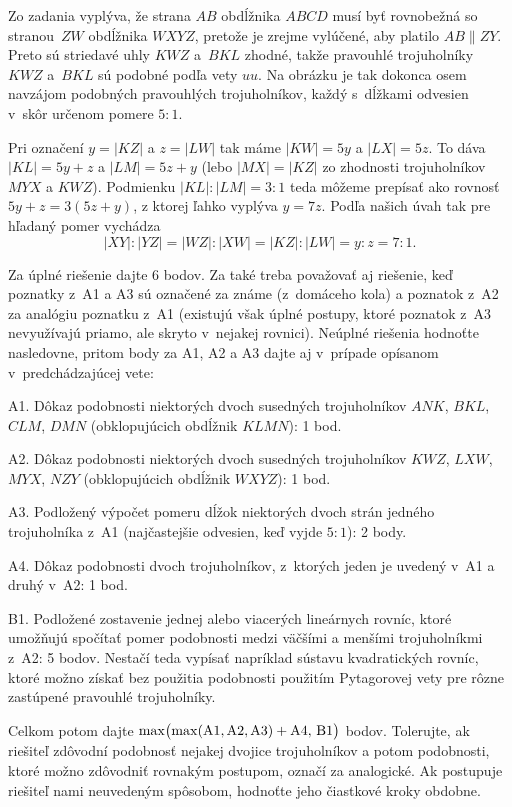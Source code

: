 {Zo zadania vyplýva, že strana $AB$ obdĺžnika $ABCD$ musí byť
rovnobežná so stranou~$ZW$ obdĺžnika $WXYZ$, pretože je zrejme vylúčené, aby
platilo $AB\parallel ZY$. Preto sú striedavé uhly $KWZ$ a~$BKL$ zhodné,
takže pravouhlé trojuholníky $KWZ$ a~$BKL$ sú podobné podľa vety $uu$.
Na obrázku je tak dokonca osem navzájom podobných pravouhlých
trojuholníkov, každý s~dĺžkami odvesien v~skôr určenom pomere $5:1$.

Pri označení $y=|KZ|$ a $z=|LW|$ tak máme $|KW|=5y$
a $|LX|=5z$. To dáva $|KL|=5y+z$ a $|LM|=5z+y$ (lebo
$|MX|=|KZ|$ zo zhodnosti trojuholníkov $MYX$ a $KWZ$).
Podmienku $|KL|:|LM|=3:1$ teda môžeme prepísať ako rovnosť
$5y+z=3(5z+y)$, z ktorej ľahko vyplýva $y=7z$. Podľa našich úvah
tak pre hľadaný pomer vychádza
$$
|XY|:|YZ|=|WZ|:|XW|=|KZ|:|LW|=y:z=7:1.
$$

\schemaABC
Za úplné riešenie dajte 6 bodov. Za také treba považovať aj
riešenie, keď poznatky z~A1 a A3 sú označené za známe (z~domáceho kola)
a poznatok z~A2 za analógiu poznatku z~A1 (existujú však úplné
postupy, ktoré poznatok z~A3 nevyužívajú priamo, ale skryto
v~nejakej rovnici). Neúplné riešenia hodnoťte nasledovne, pritom body za
A1, A2 a A3 dajte aj v~prípade opísanom v~predchádzajúcej vete:

\smallskip
\item{A1.} Dôkaz podobnosti niektorých dvoch susedných trojuholníkov $ANK$, $BKL$, $CLM$, $DMN$ (obklopujúcich obdĺžnik $KLMN$): 1 bod.
\item{A2.} Dôkaz podobnosti niektorých dvoch susedných trojuholníkov $KWZ$, $LXW$, $MYX$, $NZY$ (obklopujúcich obdĺžnik $WXYZ$): 1 bod.
\item{A3.} Podložený výpočet pomeru dĺžok niektorých dvoch strán jedného trojuholníka z~A1 (najčastejšie odvesien, keď vyjde $5:1$): 2 body.
\item{A4.} Dôkaz podobnosti dvoch trojuholníkov, z~ktorých jeden je uvedený v~A1 a druhý v~A2: 1 bod.
\item{B1.} Podložené zostavenie jednej alebo viacerých lineárnych rovníc, ktoré umožňujú spočítať pomer podobnosti medzi väčšími a menšími trojuholníkmi z~A2: 5 bodov. \hfil\break
Nestačí teda vypísať napríklad sústavu kvadratických rovníc, ktoré možno získať bez použitia podobnosti použitím Pytagorovej vety pre rôzne zastúpené pravouhlé trojuholníky.

\smallskip\noindent
Celkom potom dajte
$\rm\max\bigl(\max(A1,A2,A3)+A4,\,B1\bigr)$
bodov. Tolerujte, ak riešiteľ zdôvodní podobnosť nejakej
dvojice trojuholníkov a potom podobnosti, ktoré možno zdôvodniť rovnakým
postupom, označí za analogické. Ak postupuje riešiteľ nami neuvedeným
spôsobom, hodnoťte jeho čiastkové kroky obdobne.
\endschema
}

